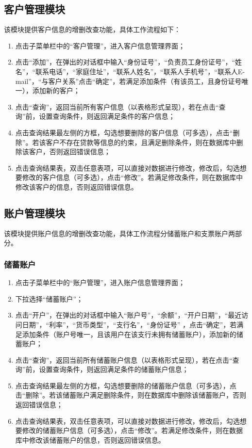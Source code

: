 \documentclass{ctexart}
\begin{document}
\subsection{\hei 客户管理模块}
该模块提供客户信息的增删改查功能，具体工作流程如下：
\begin{enumerate}
    \item 点击子菜单栏中的“客户管理”，进入客户信息管理界面；
    \item 点击“添加”，在弹出的对话框中输入“身份证号”，“负责员工身份证号”，“姓名”，“联系电话”，“家庭住址”，“联系人姓名”，“联系人手机号”，“联系人E-mail”，“与客户关系”点击“确定”，若满足添加条件（有该员工，且身份证号唯一），添加新的客户；
    \item 点击“查询”，返回当前所有客户信息（以表格形式呈现），若在点击“查询”前，设置查询条件，则返回满足条件的客户信息；
    \item 点击查询结果最左侧的方框，勾选想要删除的客户信息（可多选），点击“删除”。若该客户不存在贷款等信息的约束，且满足删除条件，则在数据库中删除该客户，否则返回错误信息；
    \item 点击查询结果表，双击任意表项，可以直接对数据进行修改，修改后，勾选想要修改的客户信息（可多选），点击“修改”。若满足修改条件，则在数据库中修改该客户的信息，否则返回错误信息。
\end{enumerate}
\subsection{\hei 账户管理模块}
该模块提供账户信息的增删改查功能，具体工作流程分储蓄账户和支票账户两部分。
\subsubsection{\hei 储蓄账户}
\begin{enumerate}
    \item 点击子菜单栏中的“账户管理”，进入账户信息管理界面；
    \item 下拉选择“储蓄账户”；
    \item 点击“开户”，在弹出的对话框中输入“账户号”，“余额”，“开户日期”，“最近访问日期”，“利率”，“货币类型”，“支行名”，“身份证号”
    ，点击“确定”，若满足添加条件（账户号唯一，且该用户在该支行未拥有储蓄账户），添加新的储蓄账户；
    \item 点击“查询”，返回当前所有储蓄账户信息（以表格形式呈现），若在点击“查询”前，设置查询条件，则返回满足条件的储蓄账户信息；
    \item 点击查询结果最左侧的方框，勾选想要删除的储蓄账户信息（可多选），点击“删除”。若该储蓄账户满足删除条件，则在数据库中删除该储蓄账户，否则返回错误信息；
    \item 点击查询结果表，双击任意表项，可以直接对数据进行修改，修改后，勾选想要修改的储蓄账户信息（可多选），点击“修改”。若满足修改条件，则在数据库中修改该储蓄账户的信息，否则返回错误信息。
\end{enumerate}
\end{document}
